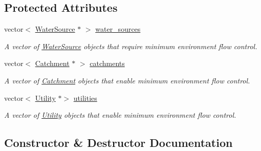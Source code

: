 \subsection*{Protected Attributes}
\begin{DoxyCompactItemize}
\item 
vector$<$ \mbox{\hyperlink{classWaterSource}{Water\+Source}} $\ast$ $>$ \mbox{\hyperlink{classMinEnvironFlowControl_ac5be281d802ad1de433bed588bb13cfe}{water\+\_\+sources}}
\begin{DoxyCompactList}\small\item\em A vector of \mbox{\hyperlink{classWaterSource}{Water\+Source}} objects that require minimum environment flow control. \end{DoxyCompactList}\item 
vector$<$ \mbox{\hyperlink{classCatchment}{Catchment}} $\ast$ $>$ \mbox{\hyperlink{classMinEnvironFlowControl_a3d55c77bc8ba49b14b20eb494868b3ce}{catchments}}
\begin{DoxyCompactList}\small\item\em A vector of \mbox{\hyperlink{classCatchment}{Catchment}} objects that enable minimum environment flow control. \end{DoxyCompactList}\item 
vector$<$ \mbox{\hyperlink{classUtility}{Utility}} $\ast$$>$ \mbox{\hyperlink{classMinEnvironFlowControl_a6c43408d05901838fa567c8e23a37009}{utilities}}
\begin{DoxyCompactList}\small\item\em A vector of \mbox{\hyperlink{classUtility}{Utility}} objects that enable minimum environment flow control. \end{DoxyCompactList}\end{DoxyCompactItemize}


\subsection{Constructor \& Destructor Documentation}
\mbox{\label{classMinEnvironFlowControl_a5b40c3f8da8c63513edb30804bf2ca01}} 
